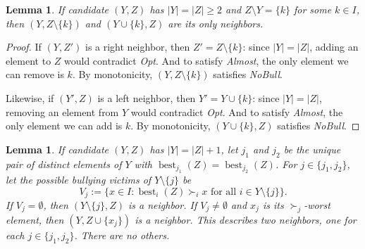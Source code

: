 \documentclass[english, 11pt]{article}
\theoremstyle{plain} %
\newtheorem{lemma}[theorem]{Lemma}
\theoremstyle{definition}
\newcommand{\opt}{\textsl{Opt}}
\newcommand{\nb}{\textsl{NoBull}}
\newcommand{\alm}{\textsl{Almost}}
\DeclareMathOperator{\best}{best}
\begin{document}
\begin{lemma}\label{lemma: Y and Z equal size}
If candidate $(Y,Z)$ has $|Y| = |Z| \geq 2$ and $Z \setminus Y = \{k\}$ for some $k \in I$, then $(Y, Z \setminus \{k\})$ and $(Y \cup \{k\}, Z)$ are its only neighbors.
\end{lemma}

\begin{proof}
If $(Y, Z')$ is a right neighbor, then $Z' = Z \setminus \{k\}$: since $|Y| = |Z|$, adding an element to $Z$ would contradict \opt. And to satisfy \alm, the only element we can remove is $k$. By monotonicity, $(Y, Z \setminus \{k\})$ satisfies \nb.

Likewise, if $(Y',Z)$ is a left neighbor, then $Y' = Y \cup \{k\}$: since $|Y| = |Z|$, removing an element from $Y$ would contradict \opt. And to satisfy \alm, the only element we can add is $k$. By monotonicity, $(Y \cup \{k\}, Z)$ satisfies \nb.
\end{proof}

\begin{lemma}\label{lemma: Y larger than Z}
If candidate $(Y,Z)$ has $|Y| = |Z| + 1$, let $j_1$ and $j_2$ be the unique pair of distinct elements of $Y$ with $\best_{j_1}(Z) = \best_{j_2}(Z)$. For $j \in \{j_1, j_2\}$, let the possible bullying victims of $Y \setminus \{j\}$ be
\[
V_j := \{x \in I: \best_i(Z) \succ_i x \text{ for all } i \in Y \setminus \{j\}\}.
\]
If $V_j = \emptyset$, then $(Y \setminus \{j\}, Z)$ is a neighbor. If $V_j \neq \emptyset$ and $x_j$ is its $\succ_j$-worst element, then $(Y, Z \cup \{x_j\})$ is a neighbor. This describes two neighbors, one for each $j \in \{j_1, j_2\}$. There are no others.
\end{lemma}
\end{document}
